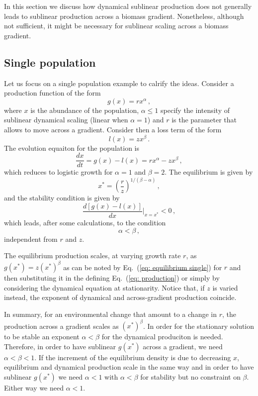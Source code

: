 \documentclass[10pt]{article}
\begin{document}
In this section we discuss how dynamical sublinear production does not generally leads to 
sublinear production across a biomass gradient.
Nonetheless, although not sufficient, it might be necessary for
sublinear scaling across a biomass gradient.

\subsection{Single population}
Let us focus on a single population example to calrify the ideas.
Consider a production function of the form
\begin{equation}
    g(x) = r x^\alpha \, ,
\label{eq: production}
\end{equation}
where $x$ is the abundance of the population, $\alpha\leq1$
specify the intensity of sublinear dynamical scaling (linear when $\alpha=1$) 
and $r$ is the parameter that allows to move across a gradient.
Consider then a loss term of the form
\begin{equation}
    l(x) = z x^\beta \, .
\end{equation} 
The evolution equaiton for the population is 
\begin{equation}
    \frac{dx}{dt} = g(x) - l(x) = r x^\alpha - z x^\beta \, ,
    \label{eq: single}
\end{equation} 
which reduces to logistic growth for $\alpha=1$ and $\beta=2$.
The equilibrium is given by
\begin{equation}
    x^* = \left(\frac{r}{z}\right)^{1/(\beta-\alpha)} \, ,
\label{eq: equilibrium single}
\end{equation}
and the stability condition is given by
\begin{equation}
    \frac{d\left[g(x)-l(x)\right]}{dx}\bigg|_{x=x^*} < 0 \, ,
\end{equation}
which leads, after some calculations, to the condition
\begin{equation}
    \alpha<\beta \, ,
\end{equation}
independent from $r$ and $z$.

The equilibrium production scales, at varying growth rate $r$,
as $g(x^*)=z(x^*)^\beta$ as can be noted by Eq.~(\ref{eq: equilibrium single})
for $r$ and then substituting it in the defining Eq.~(\ref{eq: production})
or simply by considering the dynamical equation at stationarity.
Notice that, if $z$ is varied instead, the exponent
of dynamical and across-gradient production coincide.

In summary, for an environmental change that amount to a change in $r$, 
the production across a gradient 
scales as $(x^*)^\beta$. In order for
the stationary solution to be stable an exponent $\alpha<\beta$
for the dynamical produciton is needed.
Therefore, in order to have sublinear $g(x^*)$ across a gradient,
we need $\alpha<\beta<1$.
If the increment of the equilibrium density is due to decreasing $x$,
equilibrium and dynamical production scale in the same way and in order to
have sublinear $g(x^*)$ we need $\alpha<1$ with $\alpha<\beta$ for stability
but no constraint on $\beta$. Either way we need $\alpha<1$.
\end{document}
